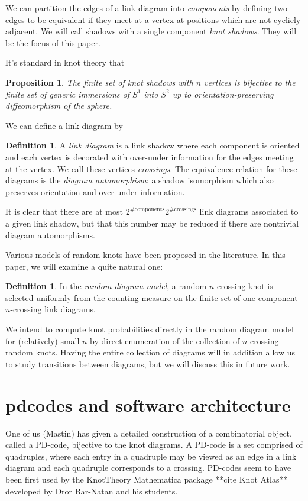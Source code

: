 \documentclass[amsmath,secnumarabic,floatfix,amssymb,nofootinbib,nobibnotes,letterpaper,11pt,tightenlines,showkeys]{revtex4}
\newtheorem{proposition}[theorem]{Proposition}
\theoremstyle{definition}
\newtheorem{definition}[theorem]{Definition}
\begin{document}
We can partition the edges of a link diagram into \emph{components} by defining two edges to be equivalent if they meet at a vertex at positions which are not cyclicly adjacent. We will call shadows with a single component \emph{knot shadows}. They will be the focus of this paper.

It's standard in knot theory that
\begin{proposition}
The finite set of knot shadows with $n$ vertices is bijective to the finite set of generic immersions of $S^1$ into $S^2$ up to orientation-preserving diffeomorphism of the sphere.
\end{proposition}

We can define a link diagram by
\begin{definition}
A \emph{link diagram} is a link shadow where each component is oriented and each vertex is decorated with over-under information for the edges meeting at the vertex. We call these vertices \emph{crossings}. The equivalence relation for these diagrams is the \emph{diagram automorphism}: a shadow isomorphism which also preserves orientation and over-under information.
\end{definition}
It is clear that there are at most $2^{\text{\# components}} 2^{\text{\# crossings}}$ link diagrams associated to a given link shadow, but that this number may be reduced if there are nontrivial diagram automorphisms.

Various models of random knots have been proposed in the literature. In this paper, we will examine a quite natural one:
\begin{definition}
In the \emph{random diagram model}, a random $n$-crossing knot is selected uniformly from the counting measure on the finite set of one-component $n$-crossing link diagrams.
\end{definition}
We intend to compute knot probabilities directly in the random diagram model for (relatively) small $n$ by direct enumeration of the collection of $n$-crossing random knots. Having the entire collection of diagrams will in addition allow us to study transitions between diagrams, but we will discuss this in future work.

\section{pdcodes and software architecture}

One of us (Mastin) has given a detailed construction of a combinatorial object,  called a PD-code, bijective to the knot diagrams. A PD-code is a set comprised of quadruples, where each entry in a quadruple may be viewed as an edge in a link diagram and each quadruple corresponds to a crossing. PD-codes seem to have been first used by the KnotTheory Mathematica package **cite Knot Atlas** developed by Dror Bar-Natan and his students.
\end{document}
